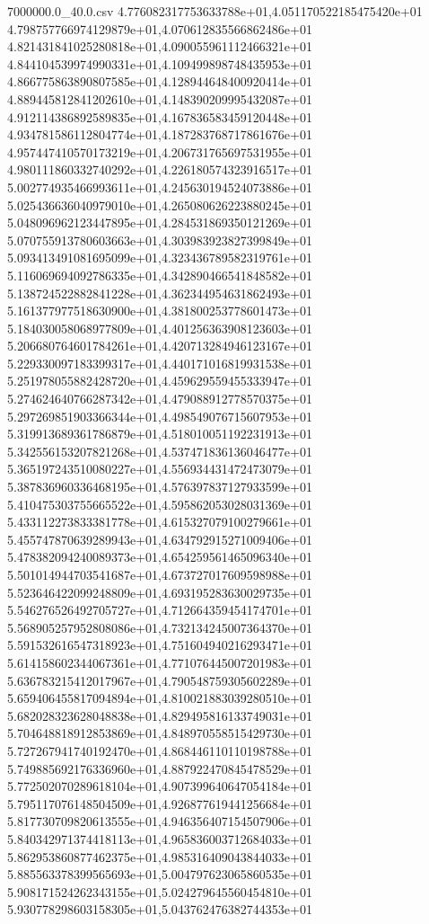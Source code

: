 \begin{filecontents*}{7000000.0_40.0.csv}
4.776082317753633788e+01,4.051170522185475420e+01
4.798757766974129879e+01,4.070612835566862486e+01
4.821431841025280818e+01,4.090055961112466321e+01
4.844104539974990331e+01,4.109499898748435953e+01
4.866775863890807585e+01,4.128944648400920414e+01
4.889445812841202610e+01,4.148390209995432087e+01
4.912114386892589835e+01,4.167836583459120448e+01
4.934781586112804774e+01,4.187283768717861676e+01
4.957447410570173219e+01,4.206731765697531955e+01
4.980111860332740292e+01,4.226180574323916517e+01
5.002774935466993611e+01,4.245630194524073886e+01
5.025436636040979010e+01,4.265080626223880245e+01
5.048096962123447895e+01,4.284531869350121269e+01
5.070755913780603663e+01,4.303983923827399849e+01
5.093413491081695099e+01,4.323436789582319761e+01
5.116069694092786335e+01,4.342890466541848582e+01
5.138724522882841228e+01,4.362344954631862493e+01
5.161377977518630900e+01,4.381800253778601473e+01
5.184030058068977809e+01,4.401256363908123603e+01
5.206680764601784261e+01,4.420713284946123167e+01
5.229330097183399317e+01,4.440171016819931538e+01
5.251978055882428720e+01,4.459629559455333947e+01
5.274624640766287342e+01,4.479088912778570375e+01
5.297269851903366344e+01,4.498549076715607953e+01
5.319913689361786879e+01,4.518010051192231913e+01
5.342556153207821268e+01,4.537471836136046477e+01
5.365197243510080227e+01,4.556934431472473079e+01
5.387836960336468195e+01,4.576397837127933599e+01
5.410475303755665522e+01,4.595862053028031369e+01
5.433112273833381778e+01,4.615327079100279661e+01
5.455747870639289943e+01,4.634792915271009406e+01
5.478382094240089373e+01,4.654259561465096340e+01
5.501014944703541687e+01,4.673727017609598988e+01
5.523646422099248809e+01,4.693195283630029735e+01
5.546276526492705727e+01,4.712664359454174701e+01
5.568905257952808086e+01,4.732134245007364370e+01
5.591532616547318923e+01,4.751604940216293471e+01
5.614158602344067361e+01,4.771076445007201983e+01
5.636783215412017967e+01,4.790548759305602289e+01
5.659406455817094894e+01,4.810021883039280510e+01
5.682028323628048838e+01,4.829495816133749031e+01
5.704648818912853869e+01,4.848970558515429730e+01
5.727267941740192470e+01,4.868446110110198788e+01
5.749885692176336960e+01,4.887922470845478529e+01
5.772502070289618104e+01,4.907399640647054184e+01
5.795117076148504509e+01,4.926877619441256684e+01
5.817730709820613555e+01,4.946356407154507906e+01
5.840342971374418113e+01,4.965836003712684033e+01
5.862953860877462375e+01,4.985316409043844033e+01
5.885563378399565693e+01,5.004797623065860535e+01
5.908171524262343155e+01,5.024279645560454810e+01
5.930778298603158305e+01,5.043762476382744353e+01

\end{filecontents*}
